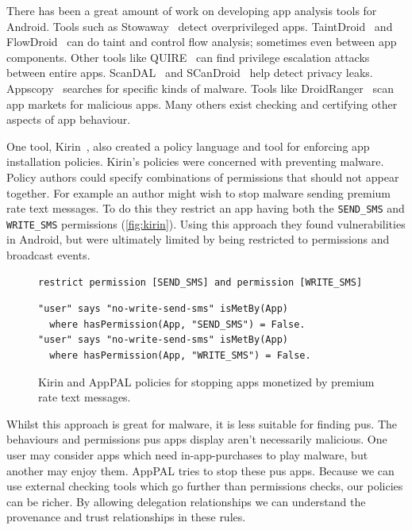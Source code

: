 \documentclass[a4paper]{scrartcl}
\begin{document}
There has been a great amount of work on developing app analysis tools for Android.  
Tools such as Stowaway~\citep{Felt:2011kj} detect overprivileged apps.
TaintDroid~\citep{Enck:2010uw} and FlowDroid~\citep{Fritz:2013vi} can do taint and control flow analysis; sometimes even between app components.
Other tools like QUIRE~\citep{Bugiel:2012ui} can find privilege escalation attacks between entire apps.
ScanDAL~\citep{Kim:2012vt} and SCanDroid~\citep{Fuchs:2009vi} help detect privacy leaks.
Appscopy~\citep{Feng:kPGZr_ja} searches for specific kinds of malware.
Tools like DroidRanger~\citep{Zhou:2012tb} scan app markets for malicious apps. 
Many others exist checking and certifying other aspects of app behaviour.

One tool, Kirin~\citep{Enck:2009ko}, also created a policy language and tool for enforcing app installation policies.
Kirin's policies were concerned with preventing malware.
Policy authors could specify combinations of permissions that should not appear together.
For example an author might wish to stop malware sending premium rate text messages.
To do this they restrict an app having both the \texttt{SEND\_SMS} and \texttt{WRITE\_SMS} permissions (\autoref{fig:kirin}).
Using this approach they found vulnerabilities in Android, but were ultimately limited by being restricted to permissions and broadcast events.
\begin{figure}
\begin{lstlisting}
restrict permission [SEND_SMS] and permission [WRITE_SMS]
\end{lstlisting}
\begin{lstlisting}
"user" says "no-write-send-sms" isMetBy(App)
  where hasPermission(App, "SEND_SMS") = False.
"user" says "no-write-send-sms" isMetBy(App)
  where hasPermission(App, "WRITE_SMS") = False.
\end{lstlisting}
\caption{Kirin and AppPAL policies for stopping apps monetized by premium rate text messages.}
\label{fig:kirin}
\end{figure}

Whilst this approach is great for malware, it is less suitable for finding \ac{pus}.
The behaviours and permissions \ac{pus} apps display aren't necessarily malicious.
One user may consider apps which need in-app-purchases to play malware, but another may enjoy them.
AppPAL tries to stop these \ac{pus} apps.
Because we can use external checking tools which go further than permissions checks, our policies can be richer.
By allowing delegation relationships we can understand the provenance and trust relationships in these rules.
\end{document}
